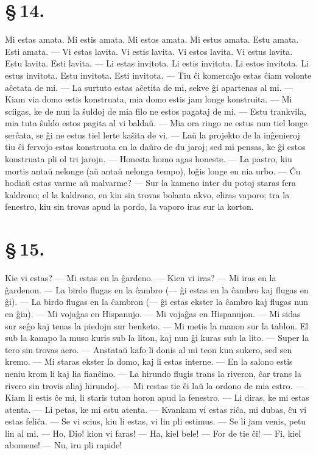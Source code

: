 \section*{\S\,14.}
Mi estas amata. Mi estis amata. Mi estos amata. Mi estus amata. Estu
amata. Esti amata. --- Vi estas lavita. Vi estis lavita. Vi estos
lavita. Vi estus lavita. Estu lavita. Esti lavita. --- Li estas
invitota. Li estis invitota. Li estos invitota. Li estus invitota.
Estu invitota. Esti invitota. --- Tiu \^ci komerca\^{\j}o estas
\^ciam volonte a\^cetata de mi. --- La surtuto estas a\^cetita de
mi, sekve \^gi apartenas al mi. --- Kiam via domo estis konstruata,
mia domo estis jam longe konstruita. --- Mi sciigas, ke de nun la
\^suldoj de mia filo ne estos pagataj de mi. --- Estu trankvila, mia
tuta \^suldo estos pagita al vi balda\u u. --- Mia ora ringo ne
estus nun tiel longe ser\^cata, se \^gi ne estus tiel lerte ka\^sita
de vi. --- La\u u la projekto de la in\^genieroj tiu \^ci fervojo
estas konstruota en la da\u uro de du jaroj; sed mi pensas, ke \^gi
estos konstruata pli ol tri jarojn. --- Honesta homo agas honeste.
--- La pastro, kiu mortis anta\u u nelonge (a\u u anta\u u nelonga
tempo), lo\^gis longe en nia urbo. --- \^Cu hodia\u u estas varme
a\u u malvarme? --- Sur la kameno inter du potoj staras fera
kaldrono; el la kaldrono, en kiu sin trovas bolanta akvo, eliras
vaporo; tra la fenestro, kiu sin trovas apud la pordo, la vaporo
iras sur la korton.

\section*{\S\,15.}
Kie vi estas? --- Mi estas en la \^gardeno. --- Kien vi iras? --- Mi
iras en la \^gardenon. --- La birdo flugas en la \^cambro (--- \^gi
estas en la \^cambro kaj flugas en \^gi). --- La birdo flugas en la
\^cambron (--- \^gi estas ekster la \^cambro kaj flugas nun en
\^gin). --- Mi voja\^gas en Hispanujo. --- Mi voja\^gas en
Hispanujon. --- Mi sidas sur se\^go kaj tenas la piedojn sur
benketo. --- Mi metis la manon sur la tablon. El sub la kanapo la
muso kuris sub la liton, kaj nun \^gi kuras sub la lito. --- Super
la tero sin trovas aero. --- Anstata\u u kafo li donis al mi teon
kun sukero, sed sen kremo. --- Mi staras ekster la domo, kaj li
estas interne. --- En la salono estis neniu krom li kaj lia
fian\^cino. --- La hirundo flugis trans la riveron, \^car trans la
rivero sin trovis aliaj hirundoj. --- Mi restas tie \^ci la\u u la
ordono de mia estro. --- Kiam li estis \^ce mi, li staris tutan
horon apud la fenestro. --- Li diras, ke mi estas atenta. --- Li
petas, ke mi estu atenta. --- Kvankam vi estas ri\^ca, mi dubas,
\^cu vi estas feli\^ca. --- Se vi scius, kiu li estas, vi lin pli
estimus. --- Se li jam venis, petu lin al mi. --- Ho, Dio! kion vi
faras! --- Ha, kiel bele! --- For de tie \^ci! --- Fi, kiel abomene!
--- Nu, iru pli rapide!


